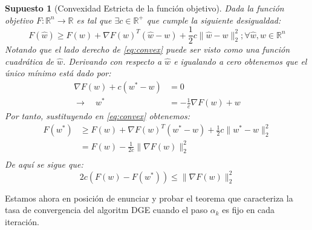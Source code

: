 \documentclass{book}
\theoremstyle{plain}
\newtheorem{assump}{Supuesto}[thm]
\theoremstyle{definition}
\theoremstyle{remark}
\begin{document}
\begin{assump}[Convexidad Estricta de la función objetivo]\label{assump:convex}
Dada la función objetivo $F:\mathbb{R}^n\rightarrow\mathbb{R}$ es tal que $\exists c \in \mathbb{R}^+$ que cumple la siguiente desigualdad:
\begin{equation}\label{eq:convex}
    F(\hat{w}) \geq F(w) + \nabla F(w)^T(\hat{w}-w) + \frac{1}{2}c\|\hat{w}-w\|^2_2; \forall \hat{w}, w \in \mathbb{R}^n
\end{equation}
Notando que el lado derecho de \ref{eq:convex} puede ser visto como una función cuadrática de $\hat{w}$. Derivando con respecto a $\hat{w}$ e igualando a cero obtenemos que el único mínimo está dado por:
\begin{equation*}
\begin{split}
    \nabla F(w) + c(w^* - w)  & = 0 \\
    \rightarrow \quad w^* & = -\frac{1}{c} \nabla F(w) + w
\end{split}
\end{equation*}
Por tanto, sustituyendo en \ref{eq:convex} obtenemos:
\begin{equation}\label{eq:convex2}
    \begin{split}
        F(w^*) & \geq F(w) + \nabla F(w)^T(w^*-w) + \frac{1}{2}c\|w^*-w\|^2_2 \\
        & = F(w) - \frac{1}{2c}\|\nabla F(w)\|_2^2 \\
    \end{split}
\end{equation}
De aquí se sigue que:
\begin{equation}
        2c(F(w)-F(w^*))  \leq  \|\nabla F(w)\|_2^2
\end{equation}
\end{assump}

Estamos ahora en posición de enunciar y probar el teorema que caracteriza la tasa de convergencia del algoritm DGE cuando el paso $\alpha_k$ es fijo en cada iteración.
\end{document}
